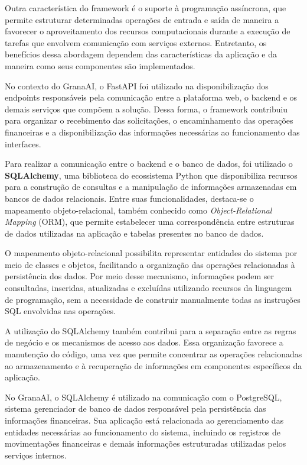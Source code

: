 Outra característica do framework é o suporte à programação assíncrona, que permite estruturar determinadas operações de entrada e saída de maneira a favorecer o aproveitamento dos recursos computacionais durante a execução de tarefas que envolvem comunicação com serviços externos. Entretanto, os benefícios dessa abordagem dependem das características da aplicação e da maneira como seus componentes são implementados.

No contexto do GranaAI, o FastAPI foi utilizado na disponibilização dos endpoints responsáveis pela comunicação entre a plataforma web, o backend e os demais serviços que compõem a solução. Dessa forma, o framework contribuiu para organizar o recebimento das solicitações, o encaminhamento das operações financeiras e a disponibilização das informações necessárias ao funcionamento das interfaces.

Para realizar a comunicação entre o backend e o banco de dados, foi utilizado o \textbf{SQLAlchemy}, uma biblioteca do ecossistema Python que disponibiliza recursos para a construção de consultas e a manipulação de informações armazenadas em bancos de dados relacionais. Entre suas funcionalidades, destaca-se o mapeamento objeto-relacional, também conhecido como \textit{Object-Relational Mapping} (ORM), que permite estabelecer uma correspondência entre estruturas de dados utilizadas na aplicação e tabelas presentes no banco de dados.

O mapeamento objeto-relacional possibilita representar entidades do sistema por meio de classes e objetos, facilitando a organização das operações relacionadas à persistência dos dados. Por meio desse mecanismo, informações podem ser consultadas, inseridas, atualizadas e excluídas utilizando recursos da linguagem de programação, sem a necessidade de construir manualmente todas as instruções SQL envolvidas nas operações.

A utilização do SQLAlchemy também contribui para a separação entre as regras de negócio e os mecanismos de acesso aos dados. Essa organização favorece a manutenção do código, uma vez que permite concentrar as operações relacionadas ao armazenamento e à recuperação de informações em componentes específicos da aplicação.

No GranaAI, o SQLAlchemy é utilizado na comunicação com o PostgreSQL, sistema gerenciador de banco de dados responsável pela persistência das informações financeiras. Sua aplicação está relacionada ao gerenciamento das entidades necessárias ao funcionamento do sistema, incluindo os registros de movimentações financeiras e demais informações estruturadas utilizadas pelos serviços internos.

